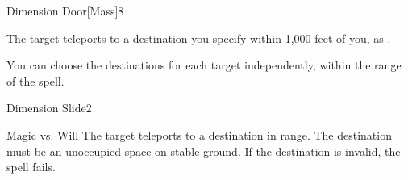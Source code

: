\begin{spellsection}{Dimension Door}[Mass]{8}
    \begin{spellheader}
    \end{spellheader}
    \begin{spellcontent}
        \begin{spelltargetinginfo}
            \spellrng{\rngmed}
        \end{spelltargetinginfo}
        \begin{spelleffects}
            \spelleffect The target teleports to a destination you specify within 1,000 feet of you, as .
        \end{spelleffects}
    \end{spellcontent}
    \begin{spellfooter}
        \spellnotes You can choose the destinations for each target independently, within the range of the spell. 
        \miscastexplode
    \end{spellfooter}
\end{spellsection}

\begin{spellsection}{Dimension Slide}{2}
    \begin{spellheader}
    \end{spellheader}
    \begin{spellcontent}
        \begin{spelltargetinginfo}
        \end{spelltargetinginfo}
        \begin{spelleffects}
            \begin{spellattack}{Magic vs. Will}
                \spelleffect The target teleports to a destination in range. The destination must be an unoccupied space on stable ground. If the destination is invalid, the spell fails.
            \end{spellattack}
        \end{spelleffects}
    \end{spellcontent}
    \begin{spellfooter}
        \miscastrandom
    \end{spellfooter}
\end{spellsection}

